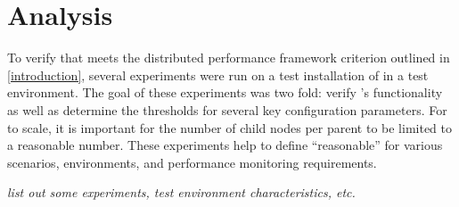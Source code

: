 \chapter{Analysis}
\label{Analysis}

To verify that \dcamp meets the distributed performance framework criterion outlined in \ref{introduction}, several
experiments were run on a test installation of \dcamp in a test environment. The goal of these experiments was two fold:
verify \dcamp's functionality as well as determine the thresholds for several key configuration parameters. For \dcamp
to scale, it is important for the number of child nodes per parent to be limited to a reasonable number. These
experiments help to define ``reasonable'' for various scenarios, environments, and performance monitoring requirements.

\emph{list out some experiments, test environment characteristics, etc.}

